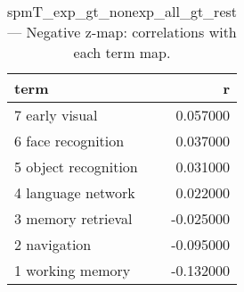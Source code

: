 \begin{table}
\caption{spmT_exp_gt_nonexp_all_gt_rest — Negative z-map: correlations with each term map.}
\label{tab:spmT_exp_gt_nonexp_all_gt_rest_neg}
\begin{tabular}{lr}
\toprule
term & r \\
\midrule
7 early visual & 0.057000 \\
6 face recognition & 0.037000 \\
5 object recognition & 0.031000 \\
4 language network & 0.022000 \\
3 memory retrieval & -0.025000 \\
2 navigation & -0.095000 \\
1 working memory & -0.132000 \\
\bottomrule
\end{tabular}
\end{table}
